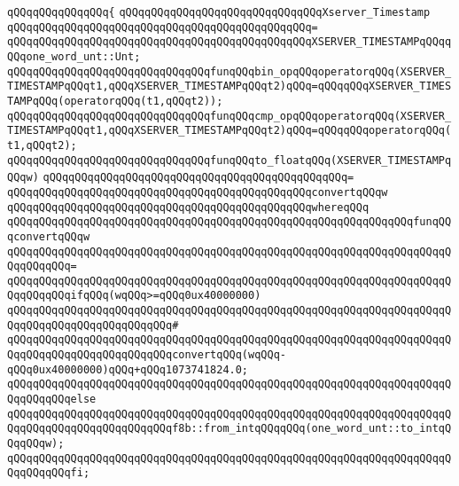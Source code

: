 \verb|qQQqqQQqqQQqqQQq{|\newline
\verb|qQQqqQQqqQQqqQQqqQQqqQQqqQQqqQQqXserver_Timestamp|\newline
\verb|qQQqqQQqqQQqqQQqqQQqqQQqqQQqqQQqqQQqqQQqqQQqqQQq=|\newline
\verb|qQQqqQQqqQQqqQQqqQQqqQQqqQQqqQQqqQQqqQQqqQQqqQQqXSERVER_TIMESTAMPqQQqqQQqone_word_unt::Unt;|\newline
\newline
\verb|qQQqqQQqqQQqqQQqqQQqqQQqqQQqqQQqfunqQQqbin_opqQQqoperatorqQQq(XSERVER_TIMESTAMPqQQqt1,qQQqXSERVER_TIMESTAMPqQQqt2)qQQq=qQQqqQQqXSERVER_TIMESTAMPqQQq(operatorqQQq(t1,qQQqt2));|\newline
\verb|qQQqqQQqqQQqqQQqqQQqqQQqqQQqqQQqfunqQQqcmp_opqQQqoperatorqQQq(XSERVER_TIMESTAMPqQQqt1,qQQqXSERVER_TIMESTAMPqQQqt2)qQQq=qQQqqQQqoperatorqQQq(t1,qQQqt2);|\newline
\newline
\verb|qQQqqQQqqQQqqQQqqQQqqQQqqQQqqQQqfunqQQqto_floatqQQq(XSERVER_TIMESTAMPqQQqw)|\newline
\verb|qQQqqQQqqQQqqQQqqQQqqQQqqQQqqQQqqQQqqQQqqQQqqQQq=|\newline
\verb|qQQqqQQqqQQqqQQqqQQqqQQqqQQqqQQqqQQqqQQqqQQqqQQqconvertqQQqw|\newline
\verb|qQQqqQQqqQQqqQQqqQQqqQQqqQQqqQQqqQQqqQQqqQQqqQQqwhereqQQq|\newline
\verb|qQQqqQQqqQQqqQQqqQQqqQQqqQQqqQQqqQQqqQQqqQQqqQQqqQQqqQQqqQQqqQQqfunqQQqconvertqQQqw|\newline
\verb|qQQqqQQqqQQqqQQqqQQqqQQqqQQqqQQqqQQqqQQqqQQqqQQqqQQqqQQqqQQqqQQqqQQqqQQqqQQqqQQq=|\newline
\verb|qQQqqQQqqQQqqQQqqQQqqQQqqQQqqQQqqQQqqQQqqQQqqQQqqQQqqQQqqQQqqQQqqQQqqQQqqQQqqQQqifqQQq(wqQQq>=qQQq0ux40000000)|\newline
\verb|qQQqqQQqqQQqqQQqqQQqqQQqqQQqqQQqqQQqqQQqqQQqqQQqqQQqqQQqqQQqqQQqqQQqqQQqqQQqqQQqqQQqqQQqqQQqqQQq#|\newline
\verb|qQQqqQQqqQQqqQQqqQQqqQQqqQQqqQQqqQQqqQQqqQQqqQQqqQQqqQQqqQQqqQQqqQQqqQQqqQQqqQQqqQQqqQQqqQQqqQQqconvertqQQq(wqQQq-qQQq0ux40000000)qQQq+qQQq1073741824.0;|\newline
\verb|qQQqqQQqqQQqqQQqqQQqqQQqqQQqqQQqqQQqqQQqqQQqqQQqqQQqqQQqqQQqqQQqqQQqqQQqqQQqqQQqelse|\newline
\verb|qQQqqQQqqQQqqQQqqQQqqQQqqQQqqQQqqQQqqQQqqQQqqQQqqQQqqQQqqQQqqQQqqQQqqQQqqQQqqQQqqQQqqQQqqQQqqQQqf8b::from_intqQQqqQQq(one_word_unt::to_intqQQqqQQqw);|\newline
\verb|qQQqqQQqqQQqqQQqqQQqqQQqqQQqqQQqqQQqqQQqqQQqqQQqqQQqqQQqqQQqqQQqqQQqqQQqqQQqqQQqfi;|\newline
